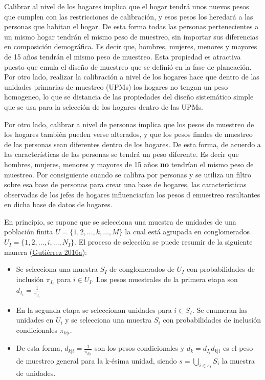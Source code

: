 \documentclass[
  12pt,
  spanish,
]{book}
\providecommand{\tightlist}{%
  \setlength{\itemsep}{0pt}\setlength{\parskip}{0pt}}
\begin{document}
Calibrar al nivel de los hogares implica que el hogar tendrá unos nuevos pesos que cumplen con las restricciones de calibración, y esos pesos los heredará a las personas que habitan el hogar. De esta forma todas las personas pertenecientes a un mismo hogar tendrán el mismo peso de muestreo, sin importar sus diferencias en composición demográfica. Es decir que, hombres, mujeres, menores y mayores de 15 años tendrán el mismo peso de muestreo. Esta propiedad es atractiva puesto que emula el diseño de muestreo que se definió en la fase de planeación. Por otro lado, realizar la calibración a nivel de los hogares hace que dentro de las unidades primarias de muestreo (UPMs) los hogares no tengan un peso homogeneo, lo que se distancia de las propiedades del diseño sistemático simple que se usa para la selección de los hogares dentro de las UPMs.

Por otro lado, calibrar a nivel de personas implica que los pesos de muestreo de los hogares también pueden verse alterados, y que los pesos finales de muestreo de las personas sean diferentes dentro de los hogares. De esta forma, de acuerdo a las características de las personas se tendrá un peso diferente. Es decir que hombres, mujeres, menores y mayores de 15 años \textbf{no} tendrían el mismo peso de muestreo. Por consiguiente cuando se calibra por personas y se utiliza un filtro sobre esa base de personas para crear una base de hogares, las características observadas de los jefes de hogares influenciarían los pesos d emuestreo resultantes en dicha base de datos de hogares.

En principio, se supone que se selecciona una muestra de unidades de una población finita \(U = \lbrace 1,2,\ldots,k,\ldots,M\rbrace\) la cual está agrupada en conglomerados \(U_I = \lbrace 1, 2,\ldots, i, \ldots, N_I \rbrace\). El proceso de selección se puede resumir de la siguiente manera (\protect\hyperlink{ref-Gutierrez_2016}{Gutiérrez 2016a}):

\begin{itemize}
\tightlist
\item
  Se selecciona una muestra \(S_I\) de conglomerados de \(U_I\) con probabilidades de inclusión \(\pi_{I_i}\) para \(i\in U_I\). Los pesos muestrales de la primera etapa son \(d_{I_i} = \frac{1}{\pi_{I_i}}\)
\item
  En la segunda etapa se seleccionan unidades para \(i\in S_I\). Se enumeran las unidades en \(U_i\) y se selecciona una muestra \(S_i\) con probabilidades de inclusión condicionales \(\pi_{k|i}\).
\item
  De esta forma, \(d_{k|i} = \frac{1}{\pi_{k|i}}\) son los pesos condicionales y \(d_k = d_{I_i}d_{k|i}\) es el peso de muestreo general para la k-ésima unidad, siendo \(s =\bigcup_{i\in s_I}S_i\) la muestra de unidades.
\end{itemize}
\end{document}
